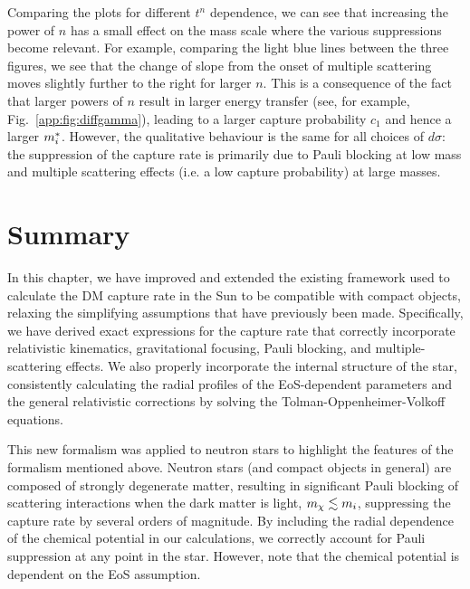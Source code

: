 Comparing the plots for different $t^n$ dependence, we can see that increasing the power of $n$ has a small effect on the mass scale where the various suppressions become relevant. For example, comparing the light blue lines between the three figures, we see that the change of slope from the onset of multiple scattering moves slightly further to the right for larger $n$. This is a consequence of the fact that larger powers of $n$ result in larger energy transfer (see, for example, Fig.~\ref{app:fig:diffgamma}), leading to a larger capture probability $c_1$ and hence a larger $m_i^*$.
However, the qualitative behaviour is the same for all choices of $d\sigma$: the suppression of the capture rate is primarily due to Pauli blocking at low mass and multiple scattering effects (i.e. a low capture probability) at large masses.


\section{Summary}
\label{ch3:sec:conclusion}


In this chapter, we have improved and extended the existing framework used to calculate the DM capture rate in the Sun to be compatible with compact objects, relaxing the simplifying assumptions that have previously been made. Specifically, we have derived exact expressions for the capture rate that correctly incorporate relativistic kinematics, gravitational focusing, Pauli blocking, and multiple-scattering effects. We also properly incorporate the internal structure of the star, consistently calculating the radial profiles of the EoS-dependent parameters and the general relativistic corrections by solving the Tolman-Oppenheimer-Volkoff equations.

This new formalism was applied to neutron stars to highlight the features of the formalism mentioned above.
Neutron stars (and compact objects in general) are composed of strongly degenerate matter, resulting in significant Pauli blocking of scattering interactions when the dark matter is light, $m_\chi\lesssim m_i$, suppressing the capture rate by several orders of magnitude. By including the radial dependence of the chemical potential in our calculations, we correctly account for Pauli suppression at any point in the star. However, note that the chemical potential is dependent on the EoS assumption.


